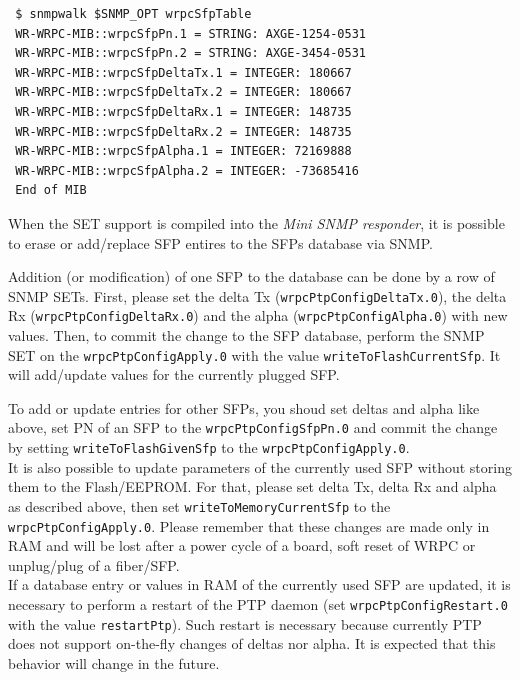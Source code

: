 \documentclass[a4paper, 12pt]{article}
\renewcommand{\_}{\underscore\allowbreak}
\begin{document}
\begin{lstlisting}
 $ snmpwalk $SNMP_OPT wrpcSfpTable
 WR-WRPC-MIB::wrpcSfpPn.1 = STRING: AXGE-1254-0531
 WR-WRPC-MIB::wrpcSfpPn.2 = STRING: AXGE-3454-0531
 WR-WRPC-MIB::wrpcSfpDeltaTx.1 = INTEGER: 180667
 WR-WRPC-MIB::wrpcSfpDeltaTx.2 = INTEGER: 180667
 WR-WRPC-MIB::wrpcSfpDeltaRx.1 = INTEGER: 148735
 WR-WRPC-MIB::wrpcSfpDeltaRx.2 = INTEGER: 148735
 WR-WRPC-MIB::wrpcSfpAlpha.1 = INTEGER: 72169888
 WR-WRPC-MIB::wrpcSfpAlpha.2 = INTEGER: -73685416
 End of MIB
\end{lstlisting}
When the SET support is compiled into the \textit{Mini SNMP responder}, it is
possible to erase or add/replace SFP entires to the SFPs database via SNMP.\\

\begin{sloppypar} %
Addition (or modification) of one SFP to the database can be done by a row of
SNMP SETs. First, please set the delta Tx (\texttt{wrpcPtpConfigDeltaTx.0}), the
delta Rx (\texttt{wrpcPtpConfigDeltaRx.0}) and the alpha (\texttt{wrpcPtpConfigAlpha.0})
with new values. Then, to commit the change to the SFP database, perform the SNMP SET on
the \texttt{wrpcPtpConfigApply.0} with the value \texttt{writeToFlashCurrentSfp}. It will
add/update values for the currently plugged SFP.
\end{sloppypar}

To add or update entries for other SFPs, you shoud set deltas and alpha like
above, set PN of an SFP to the \texttt{wrpcPtpConfigSfpPn.0} and commit
the change by setting \texttt{writeToFlashGivenSfp} to the
\texttt{wrpcPtpConfigApply.0}.\\

It is also possible to update parameters of the currently used SFP without
storing them to the Flash/EEPROM. For that, please set delta Tx, delta Rx and
alpha as described above, then set \texttt{writeToMemoryCurrentSfp} to the
\texttt{wrpcPtpConfigApply.0}. Please remember that these changes are made only
in RAM and will be lost after a power cycle of a board, soft reset of WRPC or
unplug/plug of a fiber/SFP.\\

If a database entry or values in RAM of the currently used SFP are updated, it is
necessary to perform a restart of the PTP daemon
(set \texttt{wrpcPtpConfigRestart.0} with the value \texttt{restartPtp}). Such
restart is necessary because currently PTP does not support on-the-fly changes
of deltas nor alpha. It is expected that this behavior will change in the
future.\\
\end{document}
